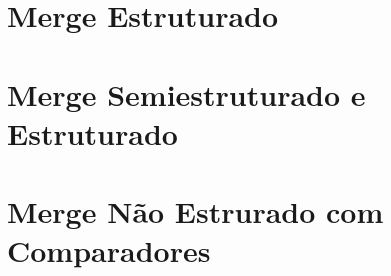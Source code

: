 \section{Merge Estruturado}
\section{Merge Semiestruturado e Estruturado}
\section{Merge Não Estrurado com Comparadores}
